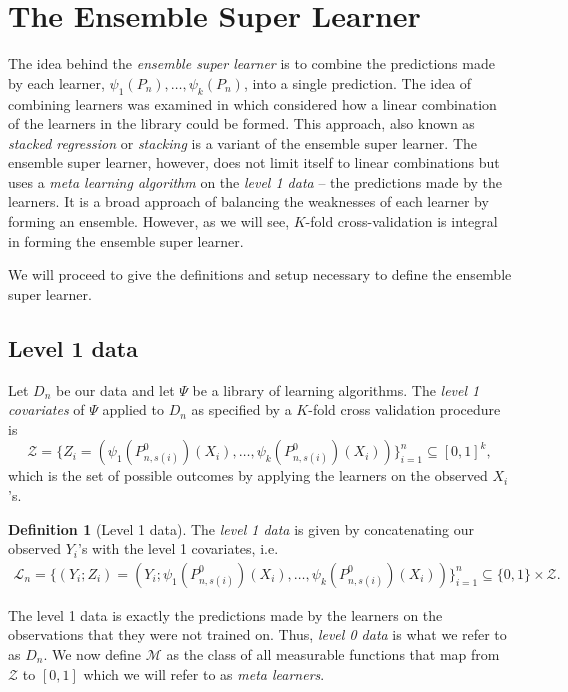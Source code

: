 \documentclass[11pt, a4paper]{article}
\theoremstyle{definition}
\newtheorem{definition}[theorem]{Definition}
\theoremstyle{remark}
\newcommand{\ml}{k}
\newcommand{\la}{\psi}
\newcommand{\lib}{\Psi}
\newcommand{\lone}{\mathcal{L}}
\begin{document}
\section{The Ensemble Super Learner}
The idea behind the \textit{ensemble super learner} is to combine the predictions made by each learner, $\la_1(P_{n}), \ldots, \la_k(P_{n}) $, into a single prediction. The idea of combining learners was examined in \citet{breiman1996stacked} which considered how a linear combination of the learners in the library could be formed. This approach, also known as \textit{stacked regression} or \textit{stacking} is a variant of the ensemble super learner. The ensemble super learner, however, does not limit itself to linear combinations but uses a \textit{meta learning algorithm} on the \textit{level 1 data} -- the predictions made by the learners. It is a broad approach of balancing the weaknesses of each learner by forming an ensemble. However, as we will see, $ K $-fold cross-validation is integral in forming the ensemble super learner. 

We will proceed to give the definitions and setup necessary to define the ensemble super learner.
\subsection{Level 1 data}
Let $ D_n $ be our data and let $ \lib $ be a library of learning algorithms. The \textit{level 1 covariates} of $ \lib $ applied to $ D_n $ as specified by a $ K $-fold cross validation procedure is  
$$ \mathcal{Z} = \{Z_i = (\la_1(P_{n, s(i)}^{0})(X_i), \ldots, \la_\ml(P_{n, s(i)}^0)(X_i) ) \}_{i = 1}^{n} \subseteq [0,1]^{k}, $$
which is the set of possible outcomes by applying the learners on the observed $ X_i $'s. 

\begin{definition}[Level 1 data]
    The \textit{level 1 data} is given by concatenating our observed $ Y_i $'s with the level 1 covariates, i.e.
    \begin{align*}
        \lone_{n}  = \{(Y_i ; Z_i) = (Y_i; \la_1(P_{n, s(i)}^{0})(X_i), \ldots, \la_\ml(P_{n, s(i)}^{0})(X_i)) \}_{i = 1}^n \subseteq \{0,1\} \times \mathcal{Z}. 
    \end{align*}
\end{definition}
The level 1 data is exactly the predictions made by the learners on the observations that they were not trained on. Thus, \textit{level 0 data} is what we refer to as $ D_n $. 
We now define $ \mathcal{M} $ as the class of all measurable functions that map from $ \mathcal{Z} $ to $ [0,1] $ which we will refer to as \textit{meta learners}. 
\end{document}
